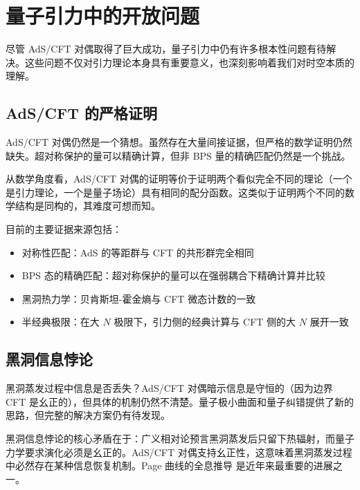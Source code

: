 
\section{量子引力中的开放问题}

尽管 AdS/CFT 对偶取得了巨大成功，量子引力中仍有许多根本性问题有待解决。这些问题不仅对引力理论本身具有重要意义，也深刻影响着我们对时空本质的理解。

\subsection{AdS/CFT 的严格证明}

AdS/CFT 对偶仍然是一个猜想。虽然存在大量间接证据，但严格的数学证明仍然缺失。超对称保护的量可以精确计算，但非 BPS 量的精确匹配仍然是一个挑战。

\begin{remark}
从数学角度看，AdS/CFT 对偶的证明等价于证明两个看似完全不同的理论（一个是引力理论，一个是量子场论）具有相同的配分函数。这类似于证明两个不同的数学结构是同构的，其难度可想而知。
\end{remark}

目前的主要证据来源包括：
\begin{itemize}
    \item 对称性匹配：AdS 的等距群与 CFT 的共形群完全相同
    \item BPS 态的精确匹配：超对称保护的量可以在强弱耦合下精确计算并比较
    \item 黑洞热力学：贝肯斯坦-霍金熵与 CFT 微态计数的一致
    \item 半经典极限：在大 $N$ 极限下，引力侧的经典计算与 CFT 侧的大 $N$ 展开一致
\end{itemize}

\subsection{黑洞信息悖论}

黑洞蒸发过程中信息是否丢失？AdS/CFT 对偶暗示信息是守恒的（因为边界 CFT 是幺正的），但具体的机制仍然不清楚。量子极小曲面和量子纠错提供了新的思路，但完整的解决方案仍有待发现。

\begin{note}
黑洞信息悖论的核心矛盾在于：广义相对论预言黑洞蒸发后只留下热辐射，而量子力学要求演化必须是幺正的。AdS/CFT 对偶支持幺正性，这意味着黑洞蒸发过程中必然存在某种信息恢复机制。Page 曲线的全息推导 \cite{Penington2020, Almheiri2019} 是近年来最重要的进展之一。
\end{note}

